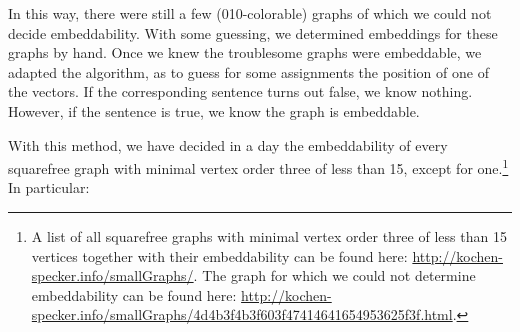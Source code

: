 \documentclass[adraft,copyright,creativecommons]{eptcs}
\theoremstyle{definition}
\theoremstyle{remark}
\begin{document}
In this way, there were still a few (010-colorable) graphs of which
we could not decide embeddability.
With some guessing,
we determined embeddings for these graphs by hand.
Once we knew the troublesome graphs were embeddable,
we adapted the algorithm, as to guess
for some assignments the position of one of the vectors.
If the corresponding
sentence turns out false, we know nothing.  However,
if the sentence is true, we know the graph is embeddable.

With this method, we have decided in a day the embeddability
of every squarefree graph with minimal vertex order three of
less than 15, except for one.\footnote{
A list of all squarefree graphs with minimal vertex order three of
less than 15 vertices together with their embeddability can
be found here:
\url{http://kochen-specker.info/smallGraphs/}.
The graph for which we could not determine
embeddability can be found
here: \url{http://kochen-specker.info/smallGraphs/4d4b3f4b3f603f47414641654953625f3f.html}.
}
In particular:
\end{document}
